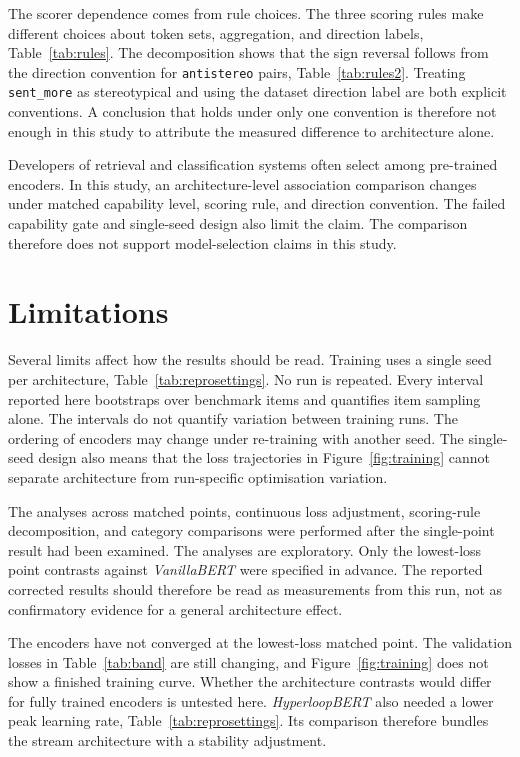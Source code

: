 \documentclass[sigconf,natbib=true,anonymous=true]{acmart}
\begin{document}
The scorer dependence comes from rule choices. The three scoring rules make
different choices about token sets, aggregation, and direction labels,
Table~\ref{tab:rules}. The decomposition shows that the sign reversal follows
from the direction convention for \texttt{antistereo} pairs,
Table~\ref{tab:rules2}. Treating \texttt{sent\_more} as stereotypical and using
the dataset direction label are both explicit conventions. A conclusion that
holds under only one convention is therefore not enough in this study to
attribute the measured difference to architecture alone.

Developers of retrieval and classification systems often select among
pre-trained encoders. In this study, an architecture-level association
comparison changes under matched capability level, scoring rule, and direction
convention. The failed capability gate and single-seed design also limit the
claim. The comparison therefore does not support model-selection claims in this
study.

\section{Limitations}
\label{sec:limits}

Several limits affect how the results should be read. Training uses a single
seed per architecture, Table~\ref{tab:reprosettings}. No run is repeated. Every
interval reported here bootstraps over benchmark items and quantifies item
sampling alone. The intervals do not quantify variation between training runs.
The ordering of encoders may change under re-training with another seed. The
single-seed design also means that the loss trajectories in
Figure~\ref{fig:training} cannot separate architecture from run-specific
optimisation variation.

The analyses across matched points, continuous loss adjustment, scoring-rule
decomposition, and category comparisons were performed after the single-point
result had been examined. The analyses are exploratory. Only the lowest-loss
point contrasts against \emph{VanillaBERT} were specified in advance. The
reported corrected results should therefore be read as measurements from this
run, not as confirmatory evidence for a general architecture effect.

The encoders have not converged at the lowest-loss matched point. The validation
losses in Table~\ref{tab:band} are still changing, and Figure~\ref{fig:training}
does not show a finished training curve. Whether the architecture contrasts
would differ for fully trained encoders is untested here. \emph{HyperloopBERT}
also needed a lower peak learning rate, Table~\ref{tab:reprosettings}. Its
comparison therefore bundles the stream architecture with a stability
adjustment.
\end{document}
